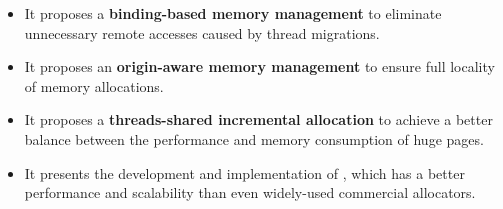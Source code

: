 \begin{itemize}

\item It proposes a \textbf{binding-based memory management} to eliminate unnecessary remote accesses caused by thread migrations.

\item It proposes an \textbf{origin-aware memory management} to ensure full locality of memory allocations. 

\item It proposes a \textbf{threads-shared incremental allocation} to achieve a better balance between the performance and memory consumption of huge pages. 

\item It presents the development and implementation of \NM{}, which has a better performance and scalability than even widely-used commercial allocators.

\end{itemize}

